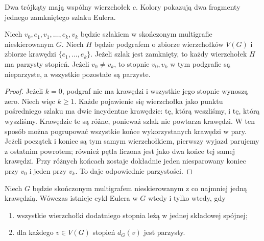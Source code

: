 \begin{center}

{\footnotesize Dwa trójkąty mają wspólny wierzchołek $c$.
Kolory pokazują dwa fragmenty jednego zamkniętego szlaku Eulera.}
\end{center}

\begin{lemat}
\label{lem:tg-euler-parity}
Niech $v_0,e_1,v_1,\dots,e_k,v_k$ będzie szlakiem
w skończonym multigrafie nieskierowanym $G$. Niech $H$ będzie podgrafem o zbiorze wierzchołków $V(G)$
i zbiorze krawędzi $\{e_1,\ldots,e_k\}$.
Jeżeli szlak jest zamknięty, to każdy wierzchołek $H$
ma parzysty stopień. Jeżeli $v_0\ne v_k$,
to stopnie $v_0,v_k$ w tym podgrafie są nieparzyste,
a wszystkie pozostałe są parzyste.
\end{lemat}

\begin{proof}
Jeżeli $k=0$, podgraf nie ma krawędzi i wszystkie
jego stopnie wynoszą zero. Niech więc $k\ge1$.
Każde pojawienie się wierzchołka jako punktu pośredniego
szlaku ma dwie incydentne krawędzie: tę, którą weszliśmy,
i tę, którą wyszliśmy. Krawędzie te są różne, ponieważ szlak
nie powtarza krawędzi. W ten sposób można pogrupować
wszystkie końce wykorzystanych krawędzi w pary.
Jeżeli początek i koniec są tym samym wierzchołkiem,
pierwszy wyjazd parujemy z ostatnim powrotem; również pętla
liczona jest jako dwa końce tej samej krawędzi. Przy różnych
końcach zostaje dokładnie jeden niesparowany koniec
przy $v_0$ i jeden przy $v_k$. To daje odpowiednie parzystości.
\end{proof}

\begin{twierdzenie}
\label{thm:tg-euler-circuit}
Niech $G$ będzie skończonym multigrafem nieskierowanym
z co najmniej jedną krawędzią. Wówczas istnieje cykl Eulera
w $G$ wtedy i tylko wtedy, gdy
\begin{enumerate}[label=(\roman*)]
\item wszystkie wierzchołki dodatniego stopnia leżą w jednej
składowej spójnej;
\item dla każdego $v\in V(G)$ stopień $d_G(v)$ jest parzysty.
\end{enumerate}
\end{twierdzenie}

